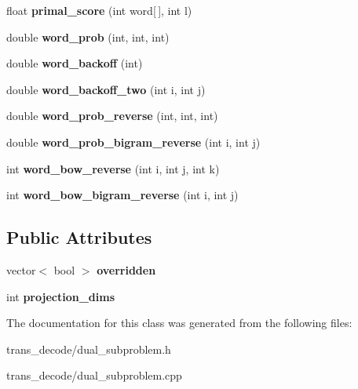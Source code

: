 \begin{DoxyCompactItemize}
\item 
\hypertarget{classSubproblem_adfba5511e1f004b989f7b2e03d998c4e}{
float {\bfseries primal\_\-score} (int word\mbox{[}$\,$\mbox{]}, int l)}
\label{classSubproblem_adfba5511e1f004b989f7b2e03d998c4e}

\item 
\hypertarget{classSubproblem_ab5e3b5e167561a79da1d815af120b6bd}{
double {\bfseries word\_\-prob} (int, int, int)}
\label{classSubproblem_ab5e3b5e167561a79da1d815af120b6bd}

\item 
\hypertarget{classSubproblem_acc456e9852f19058da2d884feec15679}{
double {\bfseries word\_\-backoff} (int)}
\label{classSubproblem_acc456e9852f19058da2d884feec15679}

\item 
\hypertarget{classSubproblem_afd0b98fea6ebb39ae5ad46d1010cb6a3}{
double {\bfseries word\_\-backoff\_\-two} (int i, int j)}
\label{classSubproblem_afd0b98fea6ebb39ae5ad46d1010cb6a3}

\item 
\hypertarget{classSubproblem_a32718cd109a52be59a7eecd3dc5f4c8a}{
double {\bfseries word\_\-prob\_\-reverse} (int, int, int)}
\label{classSubproblem_a32718cd109a52be59a7eecd3dc5f4c8a}

\item 
\hypertarget{classSubproblem_ab612e729dd11b5ac27ce9f67e0135c0a}{
double {\bfseries word\_\-prob\_\-bigram\_\-reverse} (int i, int j)}
\label{classSubproblem_ab612e729dd11b5ac27ce9f67e0135c0a}

\item 
\hypertarget{classSubproblem_a522f5f38fddff38424fe3958104a9612}{
int {\bfseries word\_\-bow\_\-reverse} (int i, int j, int k)}
\label{classSubproblem_a522f5f38fddff38424fe3958104a9612}

\item 
\hypertarget{classSubproblem_a1bce1ad18ee9c123677f39cccda7feb5}{
int {\bfseries word\_\-bow\_\-bigram\_\-reverse} (int i, int j)}
\label{classSubproblem_a1bce1ad18ee9c123677f39cccda7feb5}

\end{DoxyCompactItemize}
\subsection*{Public Attributes}
\begin{DoxyCompactItemize}
\item 
\hypertarget{classSubproblem_ab162552f8af9ee111227f6ec30b7a4f5}{
vector$<$ bool $>$ {\bfseries overridden}}
\label{classSubproblem_ab162552f8af9ee111227f6ec30b7a4f5}

\item 
\hypertarget{classSubproblem_aa981fb8aa661221937b3cd021d72c396}{
int {\bfseries projection\_\-dims}}
\label{classSubproblem_aa981fb8aa661221937b3cd021d72c396}

\end{DoxyCompactItemize}


The documentation for this class was generated from the following files:\begin{DoxyCompactItemize}
\item 
trans\_\-decode/dual\_\-subproblem.h\item 
trans\_\-decode/dual\_\-subproblem.cpp\end{DoxyCompactItemize}
